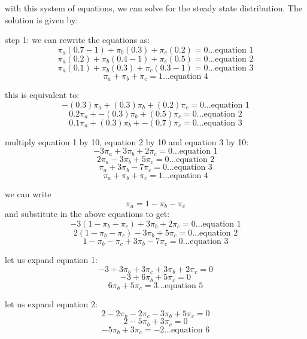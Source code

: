 \documentclass{article}
\begin{document}
with this system of equations, we can solve for the steady state distribution. The solution is given by:

step 1: we can rewrite the equations as:
\[\pi_a(0.7 - 1) + \pi_b(0.3) + \pi_c(0.2) = 0 \ldots\text{equation 1}\]
\[\pi_a(0.2) + \pi_b(0.4 - 1) + \pi_c(0.5) = 0 \ldots\text{equation 2}\]
\[\pi_a(0.1) + \pi_b(0.3) + \pi_c(0.3 - 1) = 0 \ldots\text{equation 3}\]
\[\pi_a + \pi_b + \pi_c = 1 \ldots\text{equation 4}\]

this is equivalent to:
\[-(0.3)\pi_a + (0.3)\pi_b + (0.2)\pi_c = 0 \ldots\text{equation 1}\]
\[0.2\pi_a + -(0.3)\pi_b + (0.5)\pi_c = 0 \ldots\text{equation 2}\]
\[0.1\pi_a + (0.3)\pi_b + -(0.7)\pi_c = 0 \ldots\text{equation 3}\]

multiply equation 1 by 10, equation 2 by 10 and equation 3 by 10:
\[-3\pi_a + 3\pi_b + 2\pi_c = 0 \ldots\text{equation 1}\]
\[2\pi_a - 3\pi_b + 5\pi_c = 0 \ldots\text{equation 2}\]
\[\pi_a + 3\pi_b - 7\pi_c = 0 \ldots\text{equation 3}\]
\[\pi_a + \pi_b + \pi_c = 1 \ldots\text{equation 4}\]

we can write \[\pi_a = 1 - \pi_b - \pi_c\] and substitute in the above equations to get:
\[-3(1 - \pi_b - \pi_c) + 3\pi_b + 2\pi_c = 0 \ldots\text{equation 1}\]
\[2(1 - \pi_b - \pi_c) - 3\pi_b + 5\pi_c = 0 \ldots\text{equation 2}\]
\[1 - \pi_b - \pi_c + 3\pi_b - 7\pi_c = 0 \ldots\text{equation 3}\]

let us expand equation 1:
\[-3 + 3\pi_b + 3\pi_c + 3\pi_b + 2\pi_c = 0\]
\[-3 + 6\pi_b + 5\pi_c = 0\]
\[6\pi_b + 5\pi_c = 3 \ldots\text{equation 5}\]

let us expand equation 2:
\[2 - 2\pi_b - 2\pi_c - 3\pi_b + 5\pi_c = 0\]
\[2 - 5\pi_b + 3\pi_c = 0\]
\[-5\pi_b + 3\pi_c = -2 \ldots\text{equation 6}\]
\end{document}
